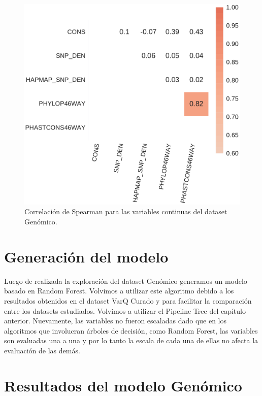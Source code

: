 \begin{figure}[H]
    \centering
    \includegraphics[scale=0.5]{documents/latex/figures/3/genomic/genomic_corr.pdf}
    \caption{Correlación de Spearman para las variables continuas del dataset Genómico.}
    \label{fig:corrplot_genomic}
\end{figure}


\section{Generación del modelo}

Luego de realizada la exploración del dataset Genómico generamos un modelo basado en Random Forest. Volvimos a utilizar este algoritmo debido a los resultados obtenidos en el dataset VarQ Curado y para facilitar la comparación entre los datasets estudiados. Volvimos a utilizar el Pipeline Tree del capítulo anterior. Nuevamente, las variables no fueron escaladas dado que en los algoritmos que involucran árboles de decisión, como Random Forest, las variables son evaluadas una a una y por lo tanto la escala de cada una de ellas no afecta la evaluación de las demás.

\section{Resultados del modelo Genómico}

